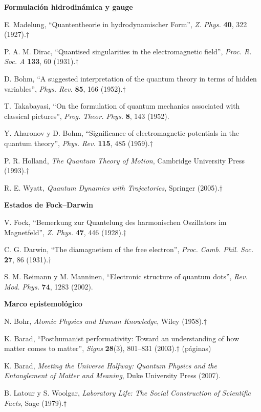 \documentclass[12pt,letterpaper]{article}
\begin{document}
\begin{enumerate}[leftmargin=2em,label={[\arabic*]}]
\item[] \textbf{Formulación hidrodinámica y gauge}
  \item E. Madelung, ``Quantentheorie in hydrodynamischer Form'', \emph{Z. Phys.} \textbf{40}, 322 (1927).$\dagger$
  \item P. A. M. Dirac, ``Quantised singularities in the electromagnetic field'', \emph{Proc. R. Soc. A} \textbf{133}, 60 (1931).$\dagger$
  \item D. Bohm, ``A suggested interpretation of the quantum theory in terms of hidden variables'', \emph{Phys. Rev.}
        \textbf{85}, 166 (1952).$\dagger$
  \item T. Takabayasi, ``On the formulation of quantum mechanics associated with classical pictures'', \emph{Prog. Theor.
        Phys.} \textbf{8}, 143 (1952).
  \item Y. Aharonov y D. Bohm, ``Significance of electromagnetic potentials in the quantum theory'', \emph{Phys. Rev.}
        \textbf{115}, 485 (1959).$\dagger$
  \item P. R. Holland, \emph{The Quantum Theory of Motion}, Cambridge University Press (1993).$\dagger$
  \item R. E. Wyatt, \emph{Quantum Dynamics with Trajectories}, Springer (2005).$\dagger$
\item[] \textbf{Estados de Fock--Darwin}
  \item V. Fock, ``Bemerkung zur Quantelung des harmonischen Oszillators im Magnetfeld'', \emph{Z. Phys.} \textbf{47}, 446 (1928).$\dagger$
  \item C. G. Darwin, ``The diamagnetism of the free electron'', \emph{Proc. Camb. Phil. Soc.} \textbf{27}, 86 (1931).$\dagger$
  \item S. M. Reimann y M. Manninen, ``Electronic structure of quantum dots'', \emph{Rev. Mod. Phys.} \textbf{74}, 1283 (2002).
\item[] \textbf{Marco epistemológico}
  \item N. Bohr, \emph{Atomic Physics and Human Knowledge}, Wiley (1958).$\dagger$
  \item K. Barad, ``Posthumanist performativity: Toward an understanding of how matter comes to matter'', \emph{Signs}
        \textbf{28}(3), 801--831 (2003).$\dagger$ (páginas)
  \item K. Barad, \emph{Meeting the Universe Halfway: Quantum Physics and the Entanglement of Matter and Meaning}, Duke
        University Press (2007).
  \item B. Latour y S. Woolgar, \emph{Laboratory Life: The Social Construction of Scientific Facts}, Sage (1979).$\dagger$

\end{enumerate}
\end{document}
